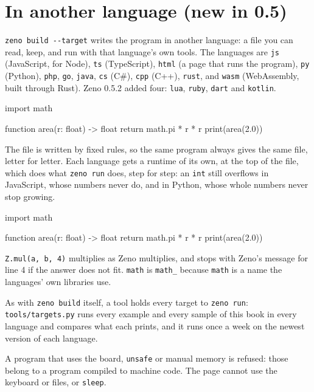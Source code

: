 \section{In another language (new in 0.5)}

\verb|zeno build --target| writes the program in another language: a
file you can read, keep, and run with that language's own tools. The
languages are \verb|js| (JavaScript, for Node), \verb|ts|
(TypeScript), \verb|html| (a page that runs the program), \verb|py|
(Python), \verb|php|, \verb|go|, \verb|java|, \verb|cs| (C\#),
\verb|cpp| (C++), \verb|rust|, and \verb|wasm| (WebAssembly, built
through Rust). Zeno 0.5.2 added four: \verb|lua|, \verb|ruby|,
\verb|dart| and \verb|kotlin|.

\begin{zeno}[file=area.zeno, cmd=zeno build --target js {file} ;; node area.js ;; zeno build --target py {file} ;; python3 area.py]
import math

function area(r: float) -> float {
    return math.pi * r * r
}
print(area(2.0))
\end{zeno}

The file is written by fixed rules, so the same program always gives
the same file, letter for letter. Each language gets a runtime of its
own, at the top of the file, which does what \verb|zeno run| does, step
for step: an \verb|int| still overflows in JavaScript, whose numbers
never do, and in Python, whose whole numbers never stop growing.

\begin{zeno}[file=area.zeno, show=no, cmd=zeno build --target py {file} > /dev/null ;; grep -A6 "^def main" area.py]
import math

function area(r: float) -> float {
    return math.pi * r * r
}
print(area(2.0))
\end{zeno}

\verb|Z.mul(a, b, 4)| multiplies as Zeno multiplies, and stops with
Zeno's message for line 4 if the answer does not fit. \verb|math| is
\verb|math_| because \verb|math| is a name the languages' own libraries
use.

As with \verb|zeno build| itself, a tool holds every target to
\verb|zeno run|: \verb|tools/targets.py| runs every example and every
sample of this book in every language and compares what each prints,
and it runs once a week on the newest version of each language.

A program that uses the board, \verb|unsafe| or manual memory is
refused: those belong to a program compiled to machine code. The page
cannot use the keyboard or files, or \verb|sleep|.

